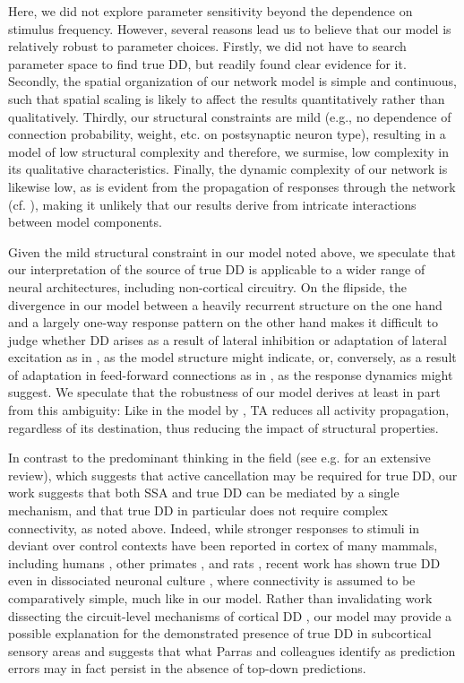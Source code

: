 \documentclass[9pt,lineno,onehalfspacing]{elife}
\begin{document}
Here, we did not explore parameter sensitivity beyond the dependence on stimulus frequency. However, several reasons lead us to believe that our model is relatively robust to parameter choices. Firstly, we did not have to search parameter space to find true DD, but readily found clear evidence for it. Secondly, the spatial organization of our network model is simple and continuous, such that spatial scaling is likely to affect the results quantitatively rather than qualitatively. Thirdly, our structural constraints are mild (e.g., no dependence of connection probability, weight, etc. on postsynaptic neuron type), resulting in a model of low structural complexity and therefore, we surmise, low complexity in its qualitative characteristics. Finally, the dynamic complexity of our network is likewise low, as is evident from the propagation of responses through the network (cf. ), making it unlikely that our results derive from intricate interactions between model components.

Given the mild structural constraint in our model noted above, we speculate that our interpretation of the source of true DD is applicable to a wider range of neural architectures, including non-cortical circuitry. On the flipside, the divergence in our model between a heavily recurrent structure on the one hand and a largely one-way response pattern on the other hand makes it difficult to judge whether DD arises as a result of lateral inhibition or adaptation of lateral excitation as in \citep{Yarden2017-eh, Hertag2020-kc, Park2020-oa}, as the model structure might indicate, or, conversely, as a result of adaptation in feed-forward connections as in \cite{Mill2011-ah}, as the response dynamics might suggest. We speculate that the robustness of our model derives at least in part from this ambiguity: Like in the model by \cite{May2015-lt}, TA reduces all activity propagation, regardless of its destination, thus reducing the impact of structural properties.

In contrast to the predominant thinking in the field (see e.g. \cite{Ross2020-qf} for an extensive review), which suggests that active cancellation may be required for true DD, our work suggests that both SSA and true DD can be mediated by a single mechanism, and that true DD in particular does not require complex connectivity, as noted above. Indeed, while stronger responses to stimuli in deviant over control contexts have been reported in cortex of many mammals, including humans \citep{Tada2019-lj}, other primates \citep{Takaura2016-eh}, and rats \citep{Taaseh2011-gg, Shiramatsu2013-qz, Harms2014-ah}, recent work has shown true DD even in dissociated neuronal culture \citep{Kubota2021-dx}, where connectivity is assumed to be comparatively simple, much like in our model. Rather than invalidating work dissecting the circuit-level mechanisms of cortical DD \citep{Hamm2016-lm, Attinger2017-dw, Yarden2022-yy}, our model may provide a possible explanation for the demonstrated presence of true DD in subcortical sensory areas \citep{Parras2017-fp} and suggests that what Parras and colleagues identify as prediction errors may in fact persist in the absence of top-down predictions.
\end{document}
